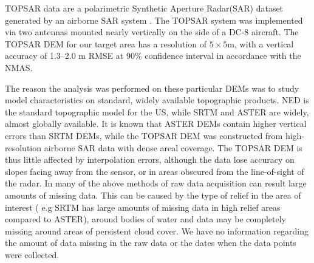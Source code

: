 \documentclass[12pt,letterpaper]{article}
\begin{document}
TOPSAR data are a polarimetric Synthetic Aperture Radar(SAR) dataset
generated by an airborne SAR system \citep{Mouginis-Mark2005}. The
TOPSAR system was implemented via two antennas mounted nearly
vertically on the side of a DC-8 aircraft.  The TOPSAR DEM for our
target area has a resolution of $5 \times 5$m, with a vertical
accuracy of 1.3--2.0 m RMSE \citep{Hooper2003} at 90\% confidence
interval in accordance with the NMAS.
 
 The reason the analysis was
  performed on these particular DEMs was to study model
  characteristics on standard, widely available topographic
  products. NED is the standard topographic model for the US, while SRTM and ASTER are
  widely, almost globally available. It is known that ASTER DEMs
  contain higher vertical errors than SRTM DEMs, while the TOPSAR DEM
  was constructed from high-resolution airborne SAR data with dense
  areal coverage. The TOPSAR DEM is thus little affected by interpolation
  errors, although the data lose accuracy on slopes facing away from
  the sensor, or in areas obscured from the line-of-sight of the
  radar. In many of the above methods of raw data acquisition can result large
  amounts of missing data. This can be caused by the type of relief in the area
  of interest ( e.g SRTM has large amounts of missing data in high relief areas 
  compared to ASTER), around bodies of water and data may be completely 
  missing around areas of persistent cloud cover. We have no information regarding
  the amount of data missing in the raw data or the dates when the data points were collected.
 
\end{document}
